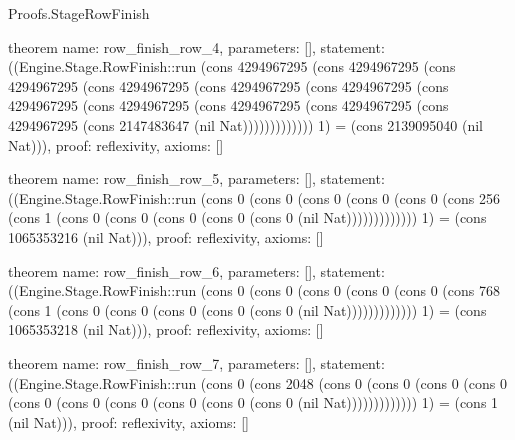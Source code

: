 \begin{lexlean}{Proofs.StageRowFinish}
\begin{semanticmodule}
theorem{
  name: row_finish_row_4,
  parameters: [],
  statement: ((Engine.Stage.RowFinish::run (cons 4294967295 (cons 4294967295 (cons 4294967295 (cons 4294967295 (cons 4294967295 (cons 4294967295 (cons 4294967295 (cons 4294967295 (cons 4294967295 (cons 4294967295 (cons 4294967295 (cons 2147483647 (nil Nat))))))))))))) 1) = (cons 2139095040 (nil Nat))),
  proof: reflexivity{},
  axioms: []
}

theorem{
  name: row_finish_row_5,
  parameters: [],
  statement: ((Engine.Stage.RowFinish::run (cons 0 (cons 0 (cons 0 (cons 0 (cons 0 (cons 256 (cons 1 (cons 0 (cons 0 (cons 0 (cons 0 (cons 0 (nil Nat))))))))))))) 1) = (cons 1065353216 (nil Nat))),
  proof: reflexivity{},
  axioms: []
}

theorem{
  name: row_finish_row_6,
  parameters: [],
  statement: ((Engine.Stage.RowFinish::run (cons 0 (cons 0 (cons 0 (cons 0 (cons 0 (cons 768 (cons 1 (cons 0 (cons 0 (cons 0 (cons 0 (cons 0 (nil Nat))))))))))))) 1) = (cons 1065353218 (nil Nat))),
  proof: reflexivity{},
  axioms: []
}

theorem{
  name: row_finish_row_7,
  parameters: [],
  statement: ((Engine.Stage.RowFinish::run (cons 0 (cons 2048 (cons 0 (cons 0 (cons 0 (cons 0 (cons 0 (cons 0 (cons 0 (cons 0 (cons 0 (cons 0 (nil Nat))))))))))))) 1) = (cons 1 (nil Nat))),
  proof: reflexivity{},
  axioms: []
}
\end{semanticmodule}
\end{lexlean}
